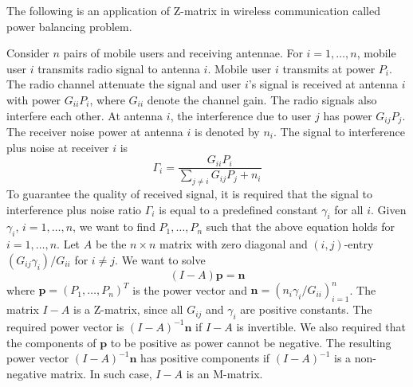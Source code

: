 \documentclass[12pt]{article}
\begin{document}
The following is an application of Z-matrix in wireless communication called power balancing problem.

Consider $n$ pairs of mobile users and receiving antennae. For
$i=1,\ldots, n$, mobile user $i$ transmits radio signal to antenna
$i$. Mobile user $i$ transmits at power $P_i$. The radio channel
attenuate the signal and user $i$'s signal is received at antenna
$i$ with power $G_{ii} P_i$, where $G_{ii}$ denote the channel
gain. The radio signals also interfere each other. At antenna $i$,
the interference due to user $j$ has power $G_{ij} P_j$. The
receiver noise power at antenna $i$ is denoted by $n_i$. The
signal to interference plus noise at receiver $i$ is
\[
 \Gamma_i = \frac{G_{ii}P_i}{\sum_{j\neq i} G_{ij} P_j + n_i}
\]
To guarantee the quality of received signal, it is required that
the signal to interference plus noise ratio $\Gamma_i$ is equal to
a predefined constant $\gamma_i$ for all $i$. Given $\gamma_i$,
$i=1,\ldots, n$, we want to find $P_1,\ldots, P_n$ such that the
above equation holds for $i=1,\ldots, n$. Let $A$ be the $n\times
n$ matrix with zero diagonal and $(i,j)$-entry
$(G_{ij}\gamma_i)/G_{ii}$ for $i\neq j$. We want to solve
\[
  (I -A) \mathbf{p} = \mathbf{n}
\]
where $\mathbf{p} = (P_1,\ldots, P_n)^T$ is the power vector and
$\mathbf{n} = (n_i \gamma_i/G_{ii})_{i=1}^n$. The matrix $I -A$ is
a Z-matrix, since all $G_{ij}$ and $\gamma_i$ are positive
constants. The required power vector is $(I-A)^{-1}\mathbf{n}$ if
$I-A$ is invertible. We also required that the components of
$\mathbf{p}$ to be positive as power cannot be negative. The
resulting power vector $(I-A)^{-1} \mathbf{n}$ has positive
components if $(I-A)^{-1}$ is a non-negative matrix. In such case,
$I-A$ is an M-matrix.
\end{document}
